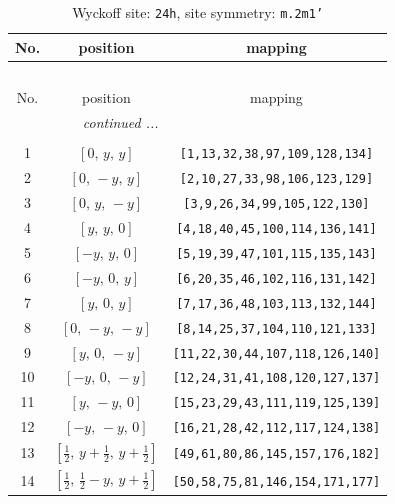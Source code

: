 \documentclass[fleqn,8pt]{jsarticle}
\begin{document}
\begin{longtable}{ccc}
\caption{Wyckoff site: {\tt 24h}, site symmetry: {\tt m.2m1'}}
 \\
 \hline \hline
No. & position & mapping \\ \hline \endfirsthead

\multicolumn{2}{l}{\tablename\ \thetable{}} \\
 \hline \hline
No. & position & mapping \\ \hline \endhead

 \hline \hline
\multicolumn{2}{r}{\footnotesize\it continued ...} \\ \endfoot

 \hline \hline
\multicolumn{2}{r}{} \\ \endlastfoot

1 & $\left[ 0,\, y,\, y \right]$ & {\tt [1,13,32,38,97,109,128,134]} \\ \hline
2 & $\left[ 0,\, - y,\, y \right]$ & {\tt [2,10,27,33,98,106,123,129]} \\ \hline
3 & $\left[ 0,\, y,\, - y \right]$ & {\tt [3,9,26,34,99,105,122,130]} \\ \hline
4 & $\left[ y,\, y,\, 0 \right]$ & {\tt [4,18,40,45,100,114,136,141]} \\ \hline
5 & $\left[ - y,\, y,\, 0 \right]$ & {\tt [5,19,39,47,101,115,135,143]} \\ \hline
6 & $\left[ - y,\, 0,\, y \right]$ & {\tt [6,20,35,46,102,116,131,142]} \\ \hline
7 & $\left[ y,\, 0,\, y \right]$ & {\tt [7,17,36,48,103,113,132,144]} \\ \hline
8 & $\left[ 0,\, - y,\, - y \right]$ & {\tt [8,14,25,37,104,110,121,133]} \\ \hline
9 & $\left[ y,\, 0,\, - y \right]$ & {\tt [11,22,30,44,107,118,126,140]} \\ \hline
10 & $\left[ - y,\, 0,\, - y \right]$ & {\tt [12,24,31,41,108,120,127,137]} \\ \hline
11 & $\left[ y,\, - y,\, 0 \right]$ & {\tt [15,23,29,43,111,119,125,139]} \\ \hline
12 & $\left[ - y,\, - y,\, 0 \right]$ & {\tt [16,21,28,42,112,117,124,138]} \\ \hline
13 & $\left[ \frac{1}{2},\, y + \frac{1}{2},\, y + \frac{1}{2} \right]$ & {\tt [49,61,80,86,145,157,176,182]} \\ \hline
14 & $\left[ \frac{1}{2},\, \frac{1}{2} - y,\, y + \frac{1}{2} \right]$ & {\tt [50,58,75,81,146,154,171,177]} \\ \hline

\end{longtable}
\end{document}

